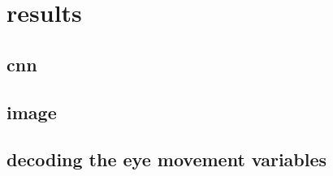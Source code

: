 \section{results}





\subsection{cnn}


\subsection{image}


\subsection{decoding the eye movement variables}


